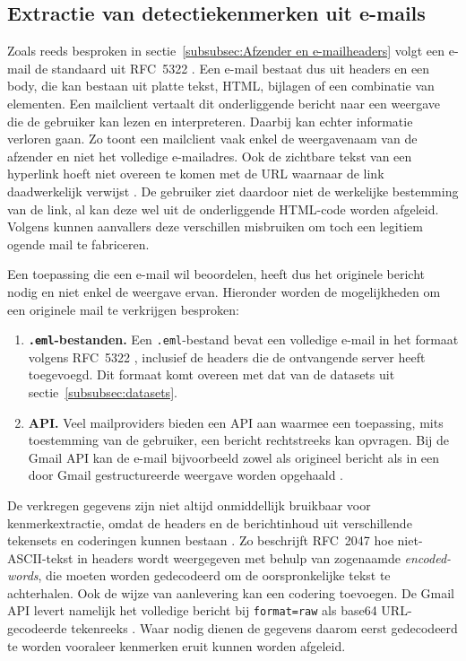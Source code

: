 \subsection{Extractie van detectiekenmerken uit e-mails}
\label{subsec:extractie-van-detectiekenmerken}

Zoals reeds besproken in sectie~\ref{subsubsec:Afzender en e-mailheaders} volgt een e-mail de standaard uit RFC~5322 \autocite{Resnick2008}. Een e-mail bestaat dus uit headers en een body, die kan bestaan uit platte tekst, HTML, bijlagen of een combinatie van elementen. Een mailclient vertaalt dit onderliggende bericht naar een weergave die de gebruiker kan lezen en interpreteren. Daarbij kan echter informatie verloren gaan. Zo toont een mailclient vaak enkel de weergavenaam van de afzender en niet het volledige e-mailadres. Ook de zichtbare tekst van een hyperlink hoeft niet overeen te komen met de URL waarnaar de link daadwerkelijk verwijst \autocite{Veit2025}. De gebruiker ziet daardoor niet de werkelijke bestemming van de link, al kan deze wel uit de onderliggende HTML-code worden afgeleid. Volgens \textcite{Chen2020} kunnen aanvallers deze verschillen misbruiken om toch een legitiem ogende mail te fabriceren.

Een toepassing die een e-mail wil beoordelen, heeft dus het originele bericht nodig en niet enkel de weergave ervan. Hieronder worden de mogelijkheden om een originele mail te verkrijgen besproken:

\begin{enumerate}
    \item \textbf{\texttt{.eml}-bestanden.} Een \texttt{.eml}-bestand bevat een volledige e-mail in het formaat volgens RFC~5322 \parencite{Resnick2008}, inclusief de headers die de ontvangende server heeft toegevoegd. Dit formaat komt overeen met dat van de datasets uit sectie~\ref{subsubsec:datasets}.
    \item \textbf{API.} Veel mailproviders bieden een API aan waarmee een toepassing, mits toestemming van de gebruiker, een bericht rechtstreeks kan opvragen. Bij de Gmail API kan de e-mail bijvoorbeeld zowel als origineel bericht als in een door Gmail gestructureerde weergave worden opgehaald .
\end{enumerate}

De verkregen gegevens zijn niet altijd onmiddellijk bruikbaar voor kenmerkextractie, omdat de headers en de berichtinhoud uit verschillende tekensets en coderingen kunnen bestaan \autocite{Koide2025}. Zo beschrijft RFC~2047 \autocite{Moore1996} hoe niet-ASCII-tekst in headers wordt weergegeven met behulp van zogenaamde \emph{encoded-words}, die moeten worden gedecodeerd om de oorspronkelijke tekst te achterhalen. Ook de wijze van aanlevering kan een codering toevoegen. De Gmail API levert namelijk het volledige bericht bij \texttt{format=raw} als base64 URL-gecodeerde tekenreeks . Waar nodig dienen de gegevens daarom eerst gedecodeerd te worden vooraleer kenmerken eruit kunnen worden afgeleid.
